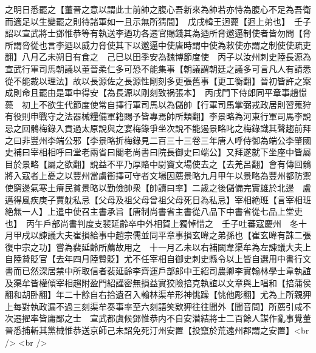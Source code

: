 之明日悉罷之【董晉之意以謂此士前帥之腹心吾新來為帥若亦恃為腹心不足為吾衛而適足以生變罷之則待諸軍如一且示無所猜間】　戊戌韓王迥薨【迥上弟也】　壬子詔以宣武將士鄧惟恭等有執送李迺功各遷官賜錢其為迺所脅邀逼制使者皆勿問【脅所謂脅從也言李迺以威力脅使其下以邀逼中使唐時謂中使為敕使亦謂之制使使疏吏翻】八月乙未朔日有食之　己巳以田季安為魏博節度使　丙子以汝州刺史陸長源為宣武行軍司馬朝議以董晉柔仁多可恐不能集事【朝議謂朝廷之議多可言凡人有請悉從不能裁以理法】故以長源佐之長源性剛刻多更張舊事【更工衡翻】晉初皆許之案成則命且罷由是軍中得安【為長源以剛刻致祸張本】　丙戌門下侍郎同平章事趙憬薨　初上不欲生代節度使常自擇行軍司馬以為儲帥【行軍司馬掌弼戎政居則習蒐狩有役則申戰守之法器械糧備軍籍賜予皆專焉帥所類翻】李景略為河東行軍司馬李說忌之回鶻梅錄入貢過太原說與之宴梅錄爭坐次說不能遏景略叱之梅錄識其聲趨前拜之曰非豐州李端公邪【李景略折梅錄見二百三十三卷三年唐人呼侍御為端公李肇國史補曰宰相相呼曰堂老兩省曰閣老尚書曰院長御史曰端公】又拜遂就下坐座中皆屬目於景略【屬之欲翻】說益不平乃厚賂中尉竇文場使去之【去羌呂翻】會有傳回鶻將入寇者上憂之以豐州當虜衝擇可守者文場因薦景略九月甲午以景略為豐州都防禦使窮邊氣寒土瘠民貧景略以勤儉帥衆【帥讀曰率】二歲之後儲備完實雄於北邊　盧邁得風疾庚子賈躭私忌【父母及祖父母曾祖父母死日為私忌】宰相絶班【言宰相班絶無一人】上遣中使召主書承旨【唐制尚書省主書從八品下中書省從七品上堂吏也】　丙午戶部尚書判度支裴延齡卒中外相賀上獨悼惜之　壬子吐蕃寇慶州　冬十月甲戌以諫議大夫崔損給事中趙宗儒並同平章事損玄暐之弟孫也【崔玄暐有誅二張復中宗之功】嘗為裴延齡所薦故用之　十一月乙未以右補闕韋渠牟為左諫議大夫上自陸贄貶官【去年四月陸䞇貶】尤不任宰相自御史刺史縣令以上皆自選用中書行文書而已然深居禁中所取信者裴延齡李齊運戶部郎中王紹司農卿李實翰林學士韋執誼及渠牟皆權傾宰相趨附盈門紹謹密無損益實狡險掊克執誼以文章與上唱和【掊蒲侯翻和胡卧翻】年二十餘自右拾遺召入翰林渠牟形神恌躁【恌他彫翻】尤為上所親狎上每對執政漏不過三刻渠牟奏事率至六刻語笑欵狎往往聞外【聞音問】所薦引咸不次遷擢率皆庸鄙之士　宣武都虞候鄧惟恭内不自安潜結將士二百餘人謀作亂事覺董晉悉捕斬其黨械惟恭送京師己未詔免死汀州安置【投竄於荒遠州郡謂之安置】<br />
<br />
